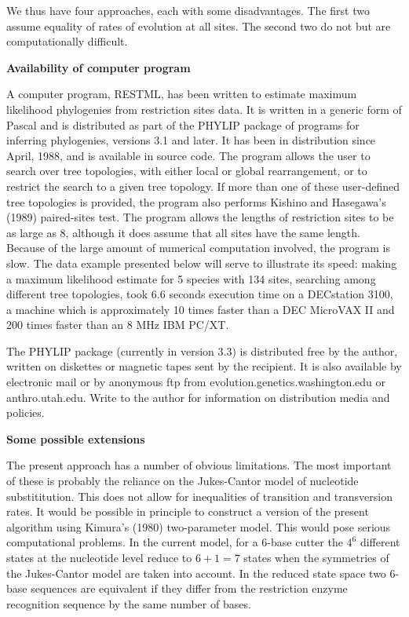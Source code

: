 We thus have four approaches, each with some disadvantages.  The first
two assume equality of rates of evolution at all sites.  The second two do not
but are computationally difficult.
\bigskip

\centerline{\bf Availability of computer program}

A computer program, RESTML, has been written to estimate maximum likelihood
phylogenies from restriction sites data.  It is written in a generic form of
Pascal and is distributed as part of the PHYLIP package of programs for
inferring phylogenies, versions 3.1 and later.  It has been in distribution
since April, 1988, and is available in source code.  The program allows
the user to search over tree topologies, with either local or global
rearrangement, or to restrict the search to a given tree topology.  If more
than one of these user-defined tree topologies is provided, the program also
performs Kishino and Hasegawa's (1989) paired-sites test.  The program allows
the lengths of restriction sites to be as large as 8, although it does assume
that all sites have the same length.  Because of the large amount of
numerical computation involved, the program is slow.  The data example
presented below will serve to illustrate its speed: making a maximum
likelihood estimate for 5 species with 134 sites, searching among
different tree topologies, took 6.6 seconds execution time on a DECstation
3100, a machine which is approximately 10 times faster than a DEC MicroVAX II
and 200 times faster than an 8 MHz IBM PC/XT. 

The PHYLIP package (currently in version 3.3) is distributed free by the
author, written on diskettes or magnetic tapes sent by the recipient.  It
is also available by electronic mail or by anonymous ftp from
evolution.genetics.washington.edu or anthro.utah.edu.  Write to the author for
information on distribution media and policies.
\bigskip

\centerline{\bf Some possible extensions}

The present approach has a number of obvious limitations.  The most important
of these is probably the reliance on the Jukes-Cantor model of nucleotide
substititution.  This does not allow for inequalities of transition and
transversion rates.  It would be possible in principle to
construct a version of the present algorithm using Kimura's (1980)
two-parameter model.  This would pose serious computational problems.
In the current model, for a 6-base cutter the $4^6$ different states at the
nucleotide level reduce to $6+1 = 7$ states when the symmetries of the
Jukes-Cantor model are taken into account.  In the reduced state space two
6-base sequences are equivalent if they differ from the restriction enzyme
recognition sequence by the same number of bases.  

